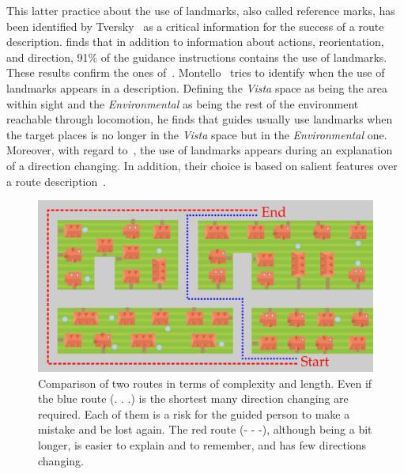 This latter practice about the use of landmarks, also called reference marks, has been identified by Tversky~\cite{tversky_1999_pictorial} as a critical information for the success of a route description. \cite{tversky_1998_space} finds that in addition to information about actions, reorientation, and direction, 91\% of the guidance instructions contains the use of landmarks. These results confirm the ones of~\cite{denis_1997_description}. Montello~\cite{montello_1993_scale} tries to identify when the use of landmarks appears in a description. Defining the \textit{Vista} space as being the area within sight and the \textit{Environmental} as being the rest of the environment reachable through locomotion, he finds that guides usually use landmarks when the target places is no longer in the \textit{Vista} space but in the \textit{Environmental} one. Moreover, with regard to~\cite{tversky_1999_pictorial}, the use of landmarks appears during an explanation of a direction changing. In addition, their choice is based on salient features over a route description~\cite{nothegger_2004_selection}.

\begin{figure}[ht!]
\centering
\includegraphics[scale=0.22]{figures/chapter3/landscape/landscape.png}
\caption{\label{fig:chap3_shortest} Comparison of two routes in terms of complexity and length. Even if the blue route (. . .) is the shortest many direction changing are required. Each of them is a risk for the guided person to make a mistake and be lost again. The red route (- - -), although being a bit longer, is easier to explain and to remember, and has few directions changing.}
\end{figure}

